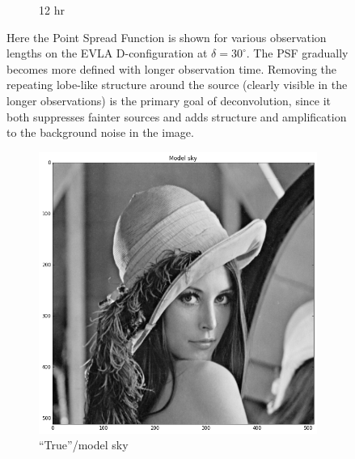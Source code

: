 \begin{figure}[h]
\begin{mdframed}
\begin{subfigure}[b]{0.24\textwidth}
  \caption{12 hr}
 \end{subfigure}
 \caption[EVLA Point Spread Function evolution]{Here the Point Spread Function is shown for various observation lengths on the EVLA D-configuration at $\delta=30^\circ$. The PSF gradually 
 becomes more defined with longer observation time. Removing the repeating lobe-like structure around the source (clearly visible in the longer observations) is the primary goal of 
 deconvolution, since it both suppresses fainter sources and adds structure and amplification to the background noise in the image.}
  \label{fig_psf}
 \end{mdframed}
\end{figure}

\begin{figure}[ht!]
 \begin{mdframed}
 \centering
 \begin{subfigure}[b]{0.39\textwidth}
  \includegraphics[width=\textwidth]{images/evla_lena_observation/model.png}
  \caption{``True''/model sky}
 \end{subfigure}
 \begin{subfigure}[b]{0.39\textwidth}

\end{subfigure}
\end{mdframed}
\end{figure}
